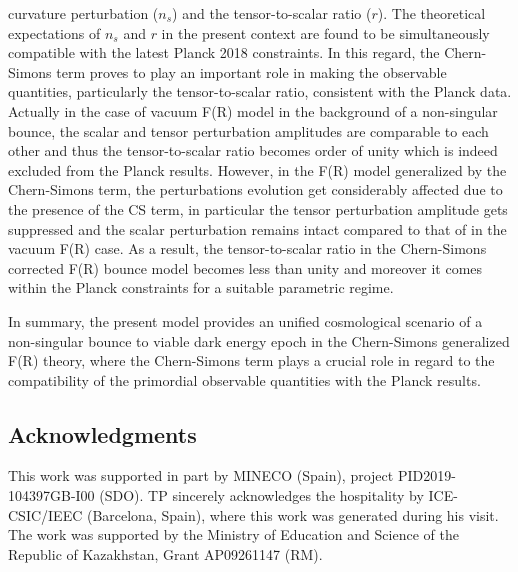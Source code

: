 \documentclass{article}
\begin{document}
curvature perturbation ($n_s$) and the tensor-to-scalar ratio ($r$). The theoretical expectations of $n_s$ and $r$ in the present context 
are found to be simultaneously compatible with the latest Planck 2018 constraints. In this regard, the Chern-Simons term proves to play 
an important role in making the observable quantities, particularly the tensor-to-scalar ratio, consistent with the Planck data. Actually in the case of 
vacuum F(R) model in the background of a non-singular bounce, the scalar and tensor perturbation amplitudes are comparable to each other and thus 
the tensor-to-scalar ratio becomes order of unity which is indeed excluded from the Planck results. However, in the F(R) model generalized by 
the Chern-Simons term, the perturbations evolution get considerably affected due to the presence of the CS term, 
in particular the tensor perturbation amplitude gets suppressed and the scalar perturbation remains intact compared 
to that of in the vacuum F(R) case. As a result, the tensor-to-scalar ratio in the Chern-Simons corrected F(R) bounce model becomes less than unity 
and moreover it comes within the Planck constraints for a suitable parametric regime.

In summary, the present model provides an unified cosmological scenario of a non-singular bounce to viable dark energy epoch in the Chern-Simons 
generalized F(R) theory, where the Chern-Simons term plays a crucial role in regard to the compatibility of the primordial 
observable quantities with the Planck results. 


\subsection*{Acknowledgments}
This work was supported in part by MINECO (Spain), project PID2019-104397GB-I00 (SDO). 
TP sincerely acknowledges the hospitality by ICE-CSIC/IEEC (Barcelona, Spain), where this work was generated during his visit. 
The work was  supported by the Ministry of Education and Science of the Republic of Kazakhstan, Grant AP09261147 (RM). 

\end{document}

